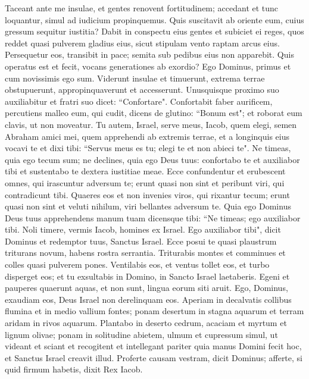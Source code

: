 \begin{biblechapter}  
\verse Taceant ante me insulae, et gentes renovent fortitudinem; accedant et tunc loquantur, simul ad iudicium propinquemus. 
\verse Quis suscitavit ab oriente eum, cuius gressum sequitur iustitia? Dabit in conspectu eius gentes et subiciet ei reges, quos reddet quasi pulverem gladius eius, sicut stipulam vento raptam arcus eius. 
\verse Persequetur eos, transibit in pace; semita sub pedibus eius non apparebit. 
\verse Quis operatus est et fecit, vocans generationes ab exordio? Ego Dominus, primus et cum novissimis ego sum. 
\verse Viderunt insulae et timuerunt, extrema terrae obstupuerunt, appropinquaverunt et accesserunt. 
\verse Unusquisque proximo suo auxiliabitur et fratri suo dicet: “Confortare". 
\verse Confortabit faber aurificem, percutiens malleo eum, qui cudit, dicens de glutino: “Bonum est"; et roborat eum clavis, ut non moveatur. 
\verse Tu autem, Israel, serve meus, Iacob, quem elegi, semen Abraham amici mei, 
\verse quem apprehendi ab extremis terrae, et a longinquis eius vocavi te et dixi tibi: “Servus meus es tu; elegi te et non abieci te". 
\verse Ne timeas, quia ego tecum sum; ne declines, quia ego Deus tuus: confortabo te et auxiliabor tibi et sustentabo te dextera iustitiae meae. 
\verse Ecce confundentur et erubescent omnes, qui irascuntur adversum te; erunt quasi non sint et peribunt viri, qui contradicunt tibi. 
\verse Quaeres eos et non invenies viros, qui rixantur tecum; erunt quasi non sint et veluti nihilum, viri bellantes adversum te. 
\verse Quia ego Dominus Deus tuus apprehendens manum tuam dicensque tibi: “Ne timeas; ego auxiliabor tibi. 
\verse Noli timere, vermis Iacob, homines ex Israel. Ego auxiliabor tibi", dicit Dominus et redemptor tuus, Sanctus Israel. 
\verse Ecce posui te quasi plaustrum triturans novum, habens rostra serrantia. Triturabis montes et comminues et colles quasi pulverem pones. 
\verse Ventilabis eos, et ventus tollet eos, et turbo disperget eos; et tu exsultabis in Domino, in Sancto Israel laetaberis. 
\verse Egeni et pauperes quaerunt aquas, et non sunt, lingua eorum siti aruit. Ego, Dominus, exaudiam eos, Deus Israel non derelinquam eos. 
\verse Aperiam in decalvatis collibus flumina et in medio vallium fontes; ponam desertum in stagna aquarum et terram aridam in rivos aquarum. 
\verse Plantabo in deserto cedrum, acaciam et myrtum et lignum olivae; ponam in solitudine abietem, ulmum et cupressum simul, 
\verse ut videant et sciant et recogitent et intellegant pariter quia manus Domini fecit hoc, et Sanctus Israel creavit illud. 
\verse Proferte causam vestram, dicit Dominus; afferte, si quid firmum habetis, dixit Rex Iacob. 

\end{biblechapter}
